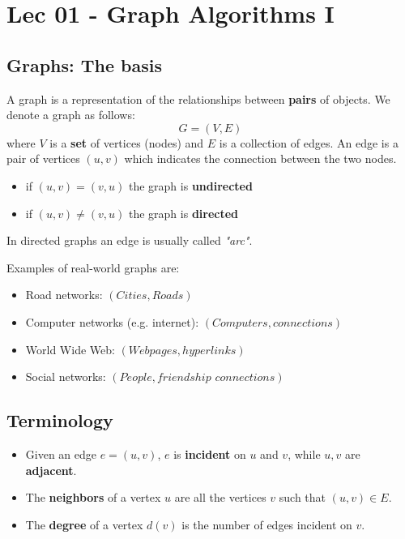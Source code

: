 \chapter{Lec 01 - Graph Algorithms I}

\section{Graphs: The basis}
A graph is a representation of the relationships between \textbf{pairs} of objects. We denote a graph as follows:
\[G = (V, E)\]
where $V$ is a \textbf{set} of vertices (nodes) and $E$ is a collection of edges. An edge is a pair of vertices $(u, v)$ which indicates the connection between the two nodes.
\begin{itemize}
    \item if $(u, v) = (v, u)$ the graph is \textbf{undirected}
    \item if $(u, v) \neq (v, u)$ the graph is \textbf{directed}
\end{itemize}
In directed graphs an edge is usually called \textit{"arc"}.

Examples of real-world graphs are:
\begin{itemize}
    \item Road networks: $(Cities, Roads)$
    \item Computer networks (e.g. internet): $(Computers, connections)$
    \item World Wide Web: $(Web pages, hyperlinks)$
    \item Social networks: $(People, friendship \,\, connections)$
\end{itemize}

\section{Terminology}
\begin{itemize}
    \item Given an edge $e = (u, v)$, $e$ is \textbf{incident} on $u$ and $v$, while $u, v$ are \textbf{adjacent}.

    \item The \textbf{neighbors} of a vertex $u$ are all the vertices $v$ such that $(u, v) \in E$. 

    \item The \textbf{degree} of a vertex $d(v)$ is the number of edges incident on $v$.
\end{itemize}

